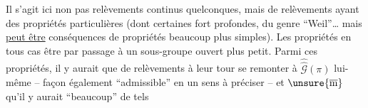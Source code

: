 Il s'agit ici non pas  relèvements continus quelconques, mais de relèvements ayant des propriétés particulières (dont certaines fort profondes, du genre ``Weil''\ldots\deleted{)} mais \uline{peut être} conséquences de propriétés beaucoup plus simples). Les propriétés   en tous cas être   par passage à un sous-groupe ouvert plus petit. Parmi ces propriétés, il y aurait que   de relèvements  à leur tour se remonter à $\widehat{\widehat{\mathcal G}}(\pi)$ lui-même --  façon également ``admissible'' en un sens à préciser -- et $\unsure{\overline{\mathrm m}}$ qu'il y aurait ``beaucoup''  de tels
